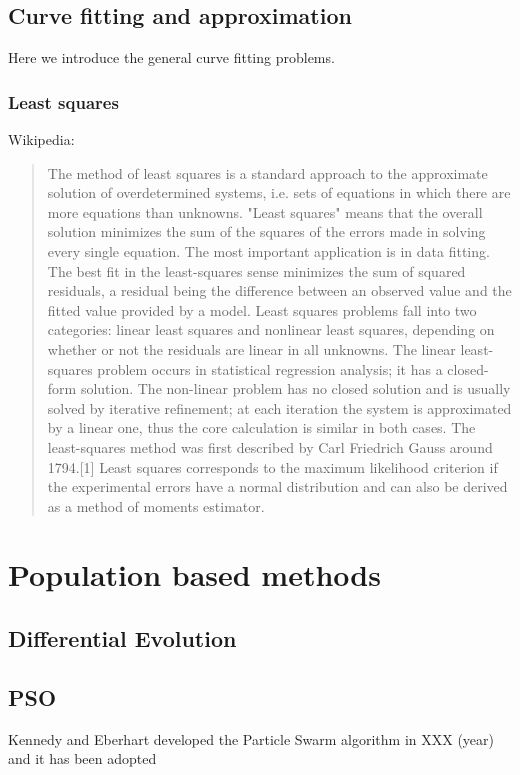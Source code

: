 \subsection{Curve fitting and approximation}
Here we introduce the general curve fitting problems.

\subsubsection{Least squares}
Wikipedia: 
\begin{quote}
  The method of least squares is a standard approach to the
  approximate solution of overdetermined systems, i.e. sets of
  equations in which there are more equations than unknowns. "Least
  squares" means that the overall solution minimizes the sum of the
  squares of the errors made in solving every single equation.  The
  most important application is in data fitting. The best fit in the
  least-squares sense minimizes the sum of squared residuals, a
  residual being the difference between an observed value and the
  fitted value provided by a model.  Least squares problems fall into
  two categories: linear least squares and nonlinear least squares,
  depending on whether or not the residuals are linear in all
  unknowns. The linear least-squares problem occurs in statistical
  regression analysis; it has a closed-form solution. The non-linear
  problem has no closed solution and is usually solved by iterative
  refinement; at each iteration the system is approximated by a linear
  one, thus the core calculation is similar in both cases.  The
  least-squares method was first described by Carl Friedrich Gauss
  around 1794.[1] Least squares corresponds to the maximum likelihood
  criterion if the experimental errors have a normal distribution and
  can also be derived as a method of moments estimator.
\end{quote}

\section{Population based methods}
\subsection{Differential Evolution}
\subsection{PSO}
Kennedy and Eberhart developed the Particle Swarm algorithm in XXX
(year) and it has been adopted

